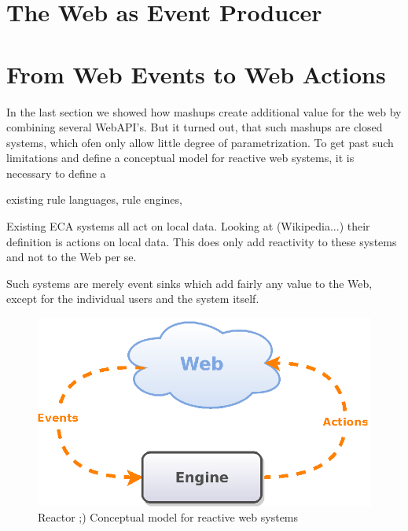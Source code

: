 \section{The Web as Event Producer}


\section{From Web Events to Web Actions}



In the last section we showed how mashups create additional value for the web by combining several WebAPI's.
But it turned out, that such mashups are closed systems, which ofen only allow little degree of parametrization.
To get past such limitations and define a conceptual model for reactive web systems, it is necessary to define a 

existing rule languages, rule engines, 

Existing ECA systems all act on local data.
Looking at (Wikipedia...) their definition is actions on local data.
This does only add reactivity to these systems and not to the Web per se.

Such systems are merely event sinks which add fairly any value to the Web, except for the individual users and the system itself.

\begin{figure}[!ht]
  \centering
  \includegraphics{figures/Conceptual_Model_Simple}
  \caption{Reactor ;) Conceptual model for reactive web systems}
  \label{fig:Conceptual_Model_Simple}
\end{figure}

